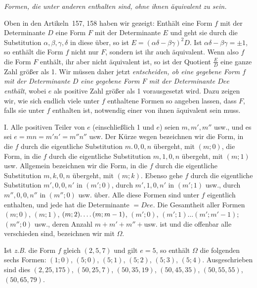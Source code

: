 \begin{center}
\textit{Formen, die unter anderen enthalten sind, ohne ihnen äquivalent zu sein.}
\end{center}

Oben in den Artikeln~157, 158 haben wir gezeigt: Enthält eine Form $f$ mit der Determinante $D$ eine Form $F$ mit der Determinante $E$ und geht sie durch die Substitution $\alpha,\beta,\gamma,\delta$ in diese über, so ist $E=(\alpha\delta-\beta\gamma)^2D$. Ist $\alpha\delta-\beta\gamma=\pm1$, so enthält die Form $f$ nicht nur $F$, sondern ist ihr auch äquivalent. Wenn also $f$ die Form $F$ enthält, ihr aber nicht äquivalent ist, so ist der Quotient $\frac{E}{D}$ eine ganze Zahl größer als 1. Wir müssen daher jetzt \textit{entscheiden, ob eine gegebene Form $f$ mit der Determinante $D$ eine gegebene Form $F$ mit der Determinante $Dee$ enthält}, wobei $e$ als positive Zahl größer als 1 vorausgesetzt wird. Dazu zeigen wir, wie sich endlich viele unter $f$ enthaltene Formen so angeben lassen, dass $F$, falls sie unter $f$ enthalten ist, notwendig einer von ihnen äquivalent sein muss.

I. Alle positiven Teiler von $e$ (einschließlich 1 und $e$) seien $m,m',m''$ usw., und es sei $e=mn=m'n'=m''n''$ usw. Der Kürze wegen bezeichnen wir die Form, in die $f$ durch die eigentliche Substitution $m.\,0,0,n$ übergeht, mit $(m;0)$, die Form, in die $f$ durch die eigentliche Substitution $m,1,0,n$ übergeht, mit $(m;1)$ usw. Allgemein bezeichnen wir die Form, in die $f$ durch die eigentliche Substitution $m,k,0,n$ übergeht, mit $(m;k)$. Ebenso gehe $f$ durch die eigentliche Substitution $m',0,0,n'$ in $(m';0)$, durch $m',1,0,n'$ in $(m';1)$ usw., durch $m'',0,0,n''$ in $(m'';0)$ usw. über. Alle diese Formen sind unter $f$ eigentlich enthalten, und jede hat die Determinante $=Dee$. Die Gesamtheit aller Formen $(m;0)$, $(m;1)$, $(m;2)\ldotp\ldotp\ldotp\ldotp(m;m-1)$, $(m';0)$, $(m';1)\ldots(m';m'-1)$; $(m'';0)$ usw., deren Anzahl $m+m'+m''+\text{usw.}$ ist und die offenbar alle verschieden sind, bezeichnen wir mit $\Omega$.

Ist \textit{z.B.} die Form $f$ gleich $(2,5,7)$ und gilt $e=5$, so enthält $\Omega$ die folgenden sechs Formen: $(1;0)$, $(5;0)$, $(5;1)$, $(5;2)$, $(5;3)$, $(5;4)$. Ausgeschrieben sind dies $(2,25,175)$, $(50,25,7)$, $(50,35,19)$, $(50,45,35)$, $(50,55,55)$, $(50,65,79)$.

